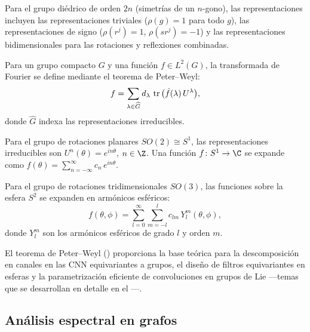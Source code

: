 \begin{example}
\label{ex:grids:dihedral-group}
Para el grupo di\'edrico de orden $2n$ (simetr\'ias de un $n$-gono), las
representaciones incluyen las representaciones triviales ($\rho(g) = 1$ para todo
$g$), las representaciones de signo ($\rho(r^j) = 1$, $\rho(sr^j) = -1$) y las
representaciones bidimensionales para las rotaciones y reflexiones combinadas.
\end{example}

\begin{definition}
\label{def:grids:fourier-compact}
Para un grupo compacto $G$ y una funci\'on $f \in L^2(G)$, la transformada de
Fourier se define mediante el teorema de Peter--Weyl:
\[
  f = \sum_{\lambda \in \widehat{G}} d_\lambda\, \operatorname{tr}\big(\hat{f}(\lambda)\, U^\lambda\big),
\]
donde $\widehat{G}$ indexa las representaciones irreducibles.
\end{definition}

\begin{definition}
\label{def:grids:circular-harmonics}
Para el grupo de rotaciones planares $SO(2) \cong S^1$, las representaciones
irreducibles son $U^n(\theta) = e^{in\theta}$, $n \in \Z$. Una funci\'on
$f \colon S^1 \to \C$ se expande como
$f(\theta) = \sum_{n=-\infty}^{\infty} c_n\, e^{in\theta}$.
\end{definition}

\begin{definition}
\label{def:grids:spherical-harmonics}
Para el grupo de rotaciones tridimensionales $SO(3)$, las funciones sobre la
esfera $S^2$ se expanden en arm\'onicos esf\'ericos:
\[
  f(\theta, \phi) = \sum_{l=0}^{\infty} \sum_{m=-l}^{l} c_{lm}\, Y_l^m(\theta, \phi),
\]
donde $Y_l^m$ son los arm\'onicos esf\'ericos de grado $l$ y orden $m$.
\end{definition}

El teorema de Peter--Weyl () proporciona la base te\'orica
para la descomposici\'on en canales en las CNN equivariantes a grupos, el
dise\~no de filtros equivariantes en esferas y la parametrizaci\'on eficiente de
convoluciones en grupos de Lie ---temas que se desarrollan en detalle en el
---.

\subsection{An\'alisis espectral en grafos}
\label{sec:grids:spectral-graphs}

